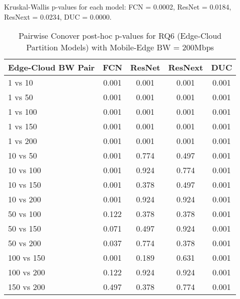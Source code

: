 \begin{table}[h]
\centering
\caption{Pairwise Conover post-hoc p-values for RQ6 (Edge-Cloud Partition Models) with Mobile-Edge BW = 200Mbps}
\label{tab:conover_edge_cloud_partition_me200}
\smallskip
Kruskal-Wallis p-values for each model: FCN = 0.0002, ResNet = 0.0184, ResNext = 0.0234, DUC = 0.0000.

\begin{tabular}{lcccc}
\toprule
Edge-Cloud BW Pair & FCN & ResNet & ResNext & DUC \\
\midrule
1 vs 10 & 0.001 & 0.001 & 0.001 & 0.001 \\
1 vs 50 & 0.001 & 0.001 & 0.001 & 0.001 \\
1 vs 100 & 0.001 & 0.001 & 0.001 & 0.001 \\
1 vs 150 & 0.001 & 0.001 & 0.001 & 0.001 \\
1 vs 200 & 0.001 & 0.001 & 0.001 & 0.001 \\
10 vs 50 & 0.001 & 0.774 & 0.497 & 0.001 \\
10 vs 100 & 0.001 & 0.924 & 0.774 & 0.001 \\
10 vs 150 & 0.001 & 0.378 & 0.497 & 0.001 \\
10 vs 200 & 0.001 & 0.924 & 0.924 & 0.001 \\
50 vs 100 & 0.122 & 0.378 & 0.378 & 0.001 \\
50 vs 150 & 0.071 & 0.497 & 0.924 & 0.001 \\
50 vs 200 & 0.037 & 0.774 & 0.378 & 0.001 \\
100 vs 150 & 0.001 & 0.189 & 0.631 & 0.001 \\
100 vs 200 & 0.122 & 0.924 & 0.924 & 0.001 \\
150 vs 200 & 0.497 & 0.378 & 0.774 & 0.001 \\
\bottomrule
\end{tabular}
\end{table}

